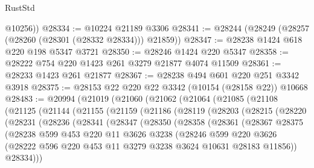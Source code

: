 \begin{lexlean}{RustStd}
\begin{coremodule}
{\begin{coremodule}
{{{{{{{{{{{{{{{{{{{{{{{{{{        @10256))
@28334 := @10224 @21189 @3306
@28341 := @28244 (@28249 (@28257 (@28260 (@28301 (@28332 @28334))) @21859))
@28347 := @28238 @1424 @618 @220 @198 @5347 @3721
@28350 := @28246 @1424 @220 @5347
@28358 := @28222 @754 @220 @1423 @261 @3279 @21877 @4074 @11509
@28361 := @28233 @1423 @261 @21877
@28367 := @28238 @494 @601 @220 @251 @3342 @3918
@28375 := @28153 @22 @220 @22 @3342 (@10154 (@28158 @22)) @10668
@28483 := @20994
    (@21019
      (@21060
        (@21062
          (@21064
            (@21085
              (@21108
                (@21125
                  (@21144
                    (@21155
                      (@21159
                        (@21186
                          (@28119
                            (@28203
                              (@28215
                                (@28220
                                  (@28231
                                    (@28236
                                      (@28341
                                        (@28347
                                          (@28350
                                            (@28358
                                              (@28361
                                                (@28367
                                                  @28375
                                                  (@28238
                                                    @599
                                                    @453
                                                    @220
                                                    @11
                                                    @3626
                                                    @3238
                                                    (@28246
                                                      @599
                                                      @220
                                                      @3626
                                                      (@28222
                                                        @596
                                                        @220
                                                        @453
                                                        @11
                                                        @3279
                                                        @3238
                                                        @3624
                                                        @10631
                                                        @28183
                                                        @11856))
                                                    @28334)))
}}}}}}}}}}}}}}}}}}}}}}}}}}
\end{coremodule}}
\end{coremodule}
\end{lexlean}
